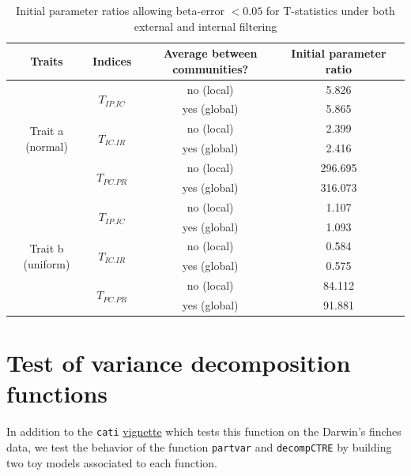 \documentclass[12pt]{article}\usepackage[]{graphicx}\usepackage[]{color}
\begin{document}
\begin{table}[h!]
\begin{center}
\caption{Initial parameter ratios allowing beta-error $<0.05$ for T-statistics under both external and internal filtering}
\begin{tabular}{|c|c|c|c|m{6cm}|}
\hline
Traits & Indices & Average between communities? & Initial parameter ratio \tabularnewline
\hline \hline \hline
\multirow{6}{*}{Trait a (normal)} & \multirow{2}{*}{$T_{IP.IC}$} & no (local) & 5.826 \tabularnewline
\cline{3-4} 
 & & yes (global) & 5.865 \tabularnewline
\cline{2-4} 
 & \multirow{2}{*}{$T_{IC.IR}$} & no (local) & 2.399 \tabularnewline
\cline{3-4} 
 & & yes (global) & 2.416 \tabularnewline
\cline{2-4} 
 & \multirow{2}{*}{$T_{PC.PR}$} & no (local) & 296.695 \tabularnewline
\cline{3-4}
 & & yes (global)& 316.073 \tabularnewline

\hline \hline \hline

\multirow{6}{*}{Trait b (uniform)} & \multirow{2}{*}{$T_{IP.IC}$} & no (local) & 1.107 \tabularnewline
\cline{3-4}
 & & yes (global) &  1.093 \tabularnewline
\cline{2-4} 
 & \multirow{2}{*}{$T_{IC.IR}$} & no (local) & 0.584 \tabularnewline
\cline{3-4} 
 & & yes (global) &  0.575 \tabularnewline
\cline{2-4} 
 & \multirow{2}{*}{$T_{PC.PR}$} & no (local) & 84.112 \tabularnewline
\cline{3-4} 
 & & yes (global)&  91.881 \tabularnewline
\hline 
\end{tabular}
\end{center}
\end{table}























\cleardoublepage

\section{Test of variance decomposition functions}
 
In addition to the \texttt{cati} \href{https://github.com/adrientaudiere/cati/blob/Package-cati/Documentation/vignette_Darwin_finches/vignette.pdf}{vignette} which tests this function on the Darwin's finches data, we test the behavior of the function \texttt{partvar} and \texttt{decompCTRE} by building two toy models associated to each function.
 
\end{document}
